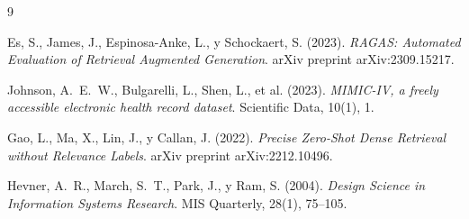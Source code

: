 \documentclass[11pt,a4paper,twocolumn]{article}
\begin{document}
\begin{thebibliography}{9}

Es, S., James, J., Espinosa-Anke, L., y Schockaert, S. (2023).
\textit{RAGAS: Automated Evaluation of Retrieval Augmented Generation}.
arXiv preprint arXiv:2309.15217.

Johnson, A.~E.~W., Bulgarelli, L., Shen, L., et al. (2023).
\textit{MIMIC-IV, a freely accessible electronic health record dataset}.
Scientific Data, 10(1), 1.

Gao, L., Ma, X., Lin, J., y Callan, J. (2022).
\textit{Precise Zero-Shot Dense Retrieval without Relevance Labels}.
arXiv preprint arXiv:2212.10496.

Hevner, A.~R., March, S.~T., Park, J., y Ram, S. (2004).
\textit{Design Science in Information Systems Research}.
MIS Quarterly, 28(1), 75--105.

\end{thebibliography}
\end{document}
